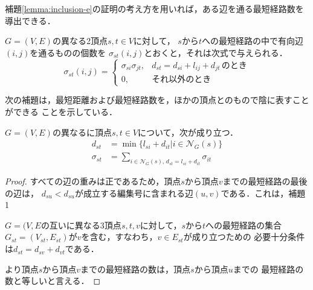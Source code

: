 補題\ref{lemma:inclusion-e}の証明の考え方を用いれば，ある辺を通る最短経路数を導出できる．

\begin{lemma-without-proof}
  $G=(V,E)$の異なる2頂点$s,t \in V$に対して，
  $s$から$t$への最短経路の中で有向辺$(i,j)$を通るものの個数を
  $\sigma_{st}(i,j)$とおくと，それは次式で与えられる．
  \begin{equation*}
    \sigma_{st}(i,j)=
    \begin{cases}
      \sigma_{si} \sigma_{jt}, & d_{st}=d_{si}+l_{ij}+d_{jt}\,\text{のとき} \\
      0, & \text{それ以外のとき}
    \end{cases}
  \end{equation*}
\end{lemma-without-proof}

次の補題は，最短距離および最短経路数を，ほかの頂点とのもので陰に表すことができる
ことを示している．

\begin{lemma}
  \label{lemma:distance-and-geodesics}
  $G=(V,E)$の異なるに頂点$s,t\in V$について，次が成り立つ．
  \begin{equation*}
    \begin{aligned}
      d_{st}&=\min\{l_{si}+d_{it}|i\in\mathcal{N}_G(s)\} \\
      \sigma_{st}&=\sum_{i\in\mathcal{N}_G(s),\,d_{st}=l_{si}+d_{it}}\sigma_{it}
    \end{aligned}
  \end{equation*}
\end{lemma}
\begin{proof}
  すべての辺の重みは正であるため，頂点$s$から頂点$v$までの最短経路の最後の辺は，
  $d_{su}<d_{su}$が成立する編集号に含まれる辺$(u,v)$である．これは，補題1
  \par $G=(V,E$の互いに異なる3頂点$s,t,v$に対して，$s$から$t$への最短経路の集合
  $G_{st}=(V_{st},E_{st})$が$v$を含む，すなわち，$v\in E_{st}$が成り立つための
  必要十分条件は$d_{st}=d_{sv}+d_{vt}$である．

  より頂点$s$から頂点$v$までの最短経路の数は，頂点$s$から頂点$u$までの
  最短経路の数と等しいと言える．
\end{proof}

